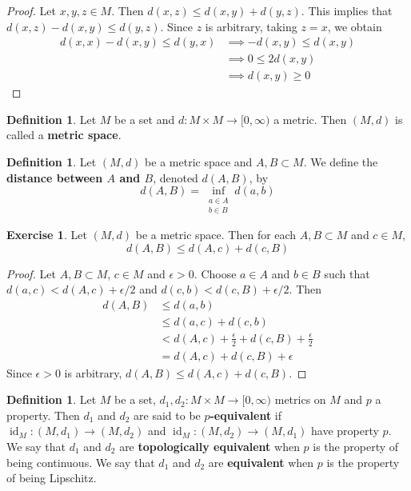 \documentclass[12pt]{amsart}
\theoremstyle{definition}
\newtheorem{defn}[definition]{Definition}
\newtheorem{ex}[definition]{Exercise}
\newcommand{\ep}{\epsilon}
\newcommand{\Rg}{[0,\infty)}
\DeclareMathOperator{\id}{id}
\newcommand{\lex}[1]{\label{ex:#1}}
\newcommand{\ld}[1]{\label{defn:#1}}
\begin{document}
	\begin{proof}
	Let $x, y, z \in M$. Then $d(x,z) \leq d(x, y) + d(y,z)$. This implies that $d(x,z) - d(x, y) \leq d(y, z)$. Since $z$ is arbitrary, taking $z=x$, we obtain 
	\begin{align*}
	d(x,x) - d(x, y) \leq d(y, x)
	& \implies - d(x, y) \leq d(x, y) \\
	& \implies 0 \leq 2 d(x,y) \\
	& \implies d(x,y) \geq 0
	\end{align*}
	\end{proof}		
	
	\begin{defn} \ld{}
	Let $M$ be a set and $d: M \times M \rightarrow \Rg$ a metric. Then $(M, d)$ is called a \textbf{metric space}.
	\end{defn}	
	
	\begin{defn} \ld{}
	Let $(M,d)$ be a metric space and $A,B \subset M$. We define the \textbf{distance between $A$ and $B$}, denoted $d(A,B)$, by $$d(A,B) = \inf_{\substack{a \in A \\ b \in B}} d(a,b)$$
	\end{defn}
	
	\begin{ex} \lex{}
	Let $(M,d)$ be a metric space. Then for each $A,B \subset M$ and $c \in M$, $$d(A,B) \leq d(A,c) + d(c, B)$$
	\end{ex}
	
	\begin{proof}
	Let $A,B \subset M$, $c \in M$ and $\ep>0$. Choose $a \in A$ and $b \in B$ such that $d(a,c) < d(A,c)+ \ep/2$ and  $d(c,b) < d(c,B)+ \ep/2$. Then 
	\begin{align*}
	d(A,B) 
	&\leq d(a,b) \\
	&\leq d(a,c) + d(c,b) \\
	&< d(A,c) + \frac{\ep}{2} + d(c,B) + \frac{\ep}{2} \\
	&= d(A,c) + d(c,B) + \ep
	\end{align*}
	Since $\ep >0$ is arbitrary, $d(A,B) \leq d(A,c) + d(c,B)$.
	\end{proof}
	
	\begin{defn} \ld{}
	Let $M$ be a set, $d_1, d_2: M \times M \rightarrow \Rg$ metrics on $M$ and $p$ a property. Then $d_1$ and $d_2$ are said to be \textbf{$p$-equivalent} if $\id_M: (M, d_1) \rightarrow (M, d_2)$ and $\id_M: (M, d_2) \rightarrow (M, d_1)$ have property $p$. We say that $d_1$ and $d_2$ are \textbf{topologically equivalent} when $p$ is the property of being continuous. We say that $d_1$ and $d_2$ are \textbf{equivalent} when $p$ is the property of being Lipschitz.
	\end{defn}	
	
\end{document}
